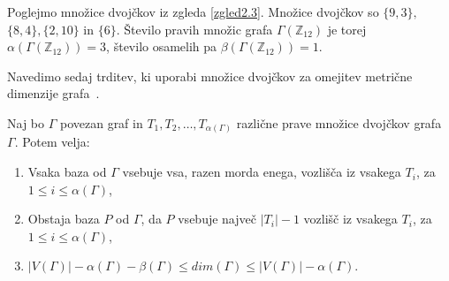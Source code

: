 \documentclass[mat1, tisk]{fmfdelo}
\newcommand{\Z}{\mathbb Z}
\begin{document}
%
\begin{zgled}
  Poglejmo množice dvojčkov iz zgleda \ref{zgled2.3}. Množice dvojčkov so 
  $\{9,3\},$ $\{8,4\},\{2,10\}$ in $\{6\}$. Število pravih množic grafa $\Gamma(\Z_{12})$ 
  je torej $\alpha(\Gamma(\Z_{12})) = 3$, število osamelih pa $\beta(\Gamma(\Z_{12})) = 1$.
\end{zgled}
%
Navedimo sedaj trditev, ki uporabi množice dvojčkov za omejitev metrične 
dimenzije grafa~\cite{3pirzada14}.
%
\begin{trditev}
  Naj bo $\Gamma$ povezan graf in $T_1, T_2, \ldots, T_{\alpha(\Gamma)}$ različne 
  prave množice dvojčkov grafa $\Gamma$. Potem velja:
  \begin{enumerate}[label=(\roman*)]
    \item Vsaka baza od $\Gamma$ vsebuje vsa, razen morda enega, vozlišča iz 
          vsakega $T_i$, za $1 \leq i \leq \alpha(\Gamma)$,
    \item Obstaja baza $P$ od $\Gamma$, da $P$ vsebuje največ $|T_i| - 1$ vozlišč 
          iz vsakega $T_i$, za $1 \leq i \leq \alpha(\Gamma)$,
    \item $|V(\Gamma)| - \alpha(\Gamma) - \beta(\Gamma) \leq dim(\Gamma) \leq |V(\Gamma)| - \alpha(\Gamma)$.
  \end{enumerate}
\end{trditev}
\end{document}
